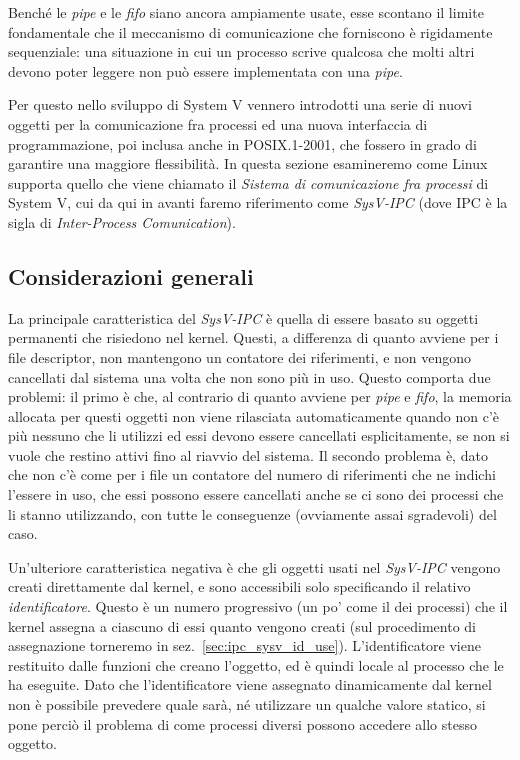 Benché le \textit{pipe} e le \textit{fifo} siano ancora ampiamente usate, esse
scontano il limite fondamentale che il meccanismo di comunicazione che
forniscono è rigidamente sequenziale: una situazione in cui un processo scrive
qualcosa che molti altri devono poter leggere non può essere implementata con
una \textit{pipe}.

Per questo nello sviluppo di System V vennero introdotti una serie di nuovi
oggetti per la comunicazione fra processi ed una nuova interfaccia di
programmazione, poi inclusa anche in POSIX.1-2001, che fossero in grado di
garantire una maggiore flessibilità.  In questa sezione esamineremo come Linux
supporta quello che viene chiamato il \textsl{Sistema di comunicazione fra
  processi} di System V, cui da qui in avanti faremo riferimento come
\textit{SysV-IPC} (dove IPC è la sigla di \textit{Inter-Process
  Comunication}).



\subsection{Considerazioni generali}
\label{sec:ipc_sysv_generic}

La principale caratteristica del \textit{SysV-IPC} è quella di essere basato
su oggetti permanenti che risiedono nel kernel. Questi, a differenza di quanto
avviene per i file descriptor, non mantengono un contatore dei riferimenti, e
non vengono cancellati dal sistema una volta che non sono più in uso.  Questo
comporta due problemi: il primo è che, al contrario di quanto avviene per
\textit{pipe} e \textit{fifo}, la memoria allocata per questi oggetti non
viene rilasciata automaticamente quando non c'è più nessuno che li utilizzi ed
essi devono essere cancellati esplicitamente, se non si vuole che restino
attivi fino al riavvio del sistema. Il secondo problema è, dato che non c'è
come per i file un contatore del numero di riferimenti che ne indichi l'essere
in uso, che essi possono essere cancellati anche se ci sono dei processi che
li stanno utilizzando, con tutte le conseguenze (ovviamente assai sgradevoli)
del caso.

Un'ulteriore caratteristica negativa è che gli oggetti usati nel
\textit{SysV-IPC} vengono creati direttamente dal kernel, e sono accessibili
solo specificando il relativo \textsl{identificatore}. Questo è un numero
progressivo (un po' come il  dei processi) che il kernel assegna a
ciascuno di essi quanto vengono creati (sul procedimento di assegnazione
torneremo in sez.~\ref{sec:ipc_sysv_id_use}). L'identificatore viene
restituito dalle funzioni che creano l'oggetto, ed è quindi locale al processo
che le ha eseguite. Dato che l'identificatore viene assegnato dinamicamente
dal kernel non è possibile prevedere quale sarà, né utilizzare un qualche
valore statico, si pone perciò il problema di come processi diversi possono
accedere allo stesso oggetto.

